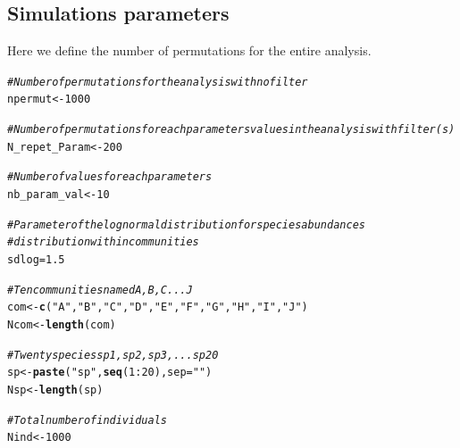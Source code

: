 \documentclass[12pt]{article}\usepackage[]{graphicx}\usepackage[]{color}
\makeatletter
\newcommand{\hlnum}[1]{\textcolor[rgb]{0.686,0.059,0.569}{#1}}%
\newcommand{\hlstr}[1]{\textcolor[rgb]{0.192,0.494,0.8}{#1}}%
\newcommand{\hlcom}[1]{\textcolor[rgb]{0.678,0.584,0.686}{\textit{#1}}}%
\newcommand{\hlopt}[1]{\textcolor[rgb]{0,0,0}{#1}}%
\newcommand{\hlstd}[1]{\textcolor[rgb]{0.345,0.345,0.345}{#1}}%
\newcommand{\hlkwb}[1]{\textcolor[rgb]{0.69,0.353,0.396}{#1}}%
\newcommand{\hlkwc}[1]{\textcolor[rgb]{0.333,0.667,0.333}{#1}}%
\newcommand{\hlkwd}[1]{\textcolor[rgb]{0.737,0.353,0.396}{\textbf{#1}}}%
\newenvironment{kframe}{%
 \def\at@end@of@kframe{}%
 \ifinner\ifhmode%
  \def\at@end@of@kframe{\end{minipage}}%
  \begin{minipage}{\columnwidth}%
 \fi\fi%
 \def\FrameCommand##1{\hskip\@totalleftmargin \hskip-\fboxsep
 \colorbox{shadecolor}{##1}\hskip-\fboxsep
     \hskip-\linewidth \hskip-\@totalleftmargin \hskip\columnwidth}%
 \MakeFramed {\advance\hsize-\width
   \@totalleftmargin\z@ \linewidth\hsize
   \@setminipage}}%
 {\par\unskip\endMakeFramed%
 \at@end@of@kframe}
\newenvironment{knitrout}{}{} %
\makeatother
\begin{document}
  
  
  
  
  
  
  \subsection{Simulations parameters}

Here we define the number of permutations for the entire analysis. 

\begin{knitrout}\small
{}\color{fgcolor}\begin{kframe}
\begin{alltt}
\hlcom{#Number of permutations for the analysis with no filter}
\hlstd{npermut} \hlkwb{<-} \hlnum{1000}

\hlcom{#Number of permutations for each parameters values in the analysis with filter(s)}
\hlstd{N_repet_Param} \hlkwb{<-} \hlnum{200}

\hlcom{#Number of values for each parameters}
\hlstd{nb_param_val} \hlkwb{<-} \hlnum{10}
\end{alltt}
\end{kframe}
\end{knitrout}

\begin{knitrout}\small
{}\color{fgcolor}\begin{kframe}
\begin{alltt}
\hlcom{#Parameter of the log normal distribution for species abundances }
\hlcom{#distribution within communities}
\hlstd{sdlog} \hlkwb{=} \hlnum{1.5}

\hlcom{#Ten communities named A, B, C ... J}
\hlstd{com} \hlkwb{<-} \hlkwd{c}\hlstd{(}\hlstr{"A"}\hlstd{,} \hlstr{"B"}\hlstd{,} \hlstr{"C"}\hlstd{,} \hlstr{"D"}\hlstd{,} \hlstr{"E"}\hlstd{,} \hlstr{"F"}\hlstd{,} \hlstr{"G"}\hlstd{,} \hlstr{"H"}\hlstd{,} \hlstr{"I"}\hlstd{,} \hlstr{"J"}\hlstd{)}
\hlstd{Ncom} \hlkwb{<-} \hlkwd{length}\hlstd{(com)}

\hlcom{#Twenty species sp1, sp2, sp3, ... sp20}
\hlstd{sp} \hlkwb{<-} \hlkwd{paste}\hlstd{(}\hlstr{"sp"}\hlstd{,} \hlkwd{seq}\hlstd{(}\hlnum{1}\hlopt{:}\hlnum{20}\hlstd{),} \hlkwc{sep} \hlstd{=} \hlstr{""}\hlstd{)}
\hlstd{Nsp} \hlkwb{<-} \hlkwd{length}\hlstd{(sp)}

\hlcom{#Total number of individuals}
\hlstd{Nind} \hlkwb{<-} \hlnum{1000}
\end{alltt}
\end{kframe}
\end{knitrout}
\end{document}
